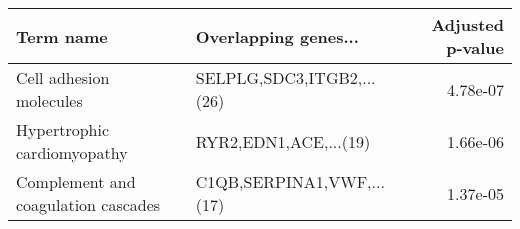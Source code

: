 \begin{tabular}{llr}
\toprule
                          Term name &      Overlapping genes... &  Adjusted p-value \\
\midrule
            Cell adhesion molecules & SELPLG,SDC3,ITGB2,...(26) &          4.78e-07 \\
        Hypertrophic cardiomyopathy &     RYR2,EDN1,ACE,...(19) &          1.66e-06 \\
Complement and coagulation cascades & C1QB,SERPINA1,VWF,...(17) &          1.37e-05 \\
\bottomrule
\end{tabular}
